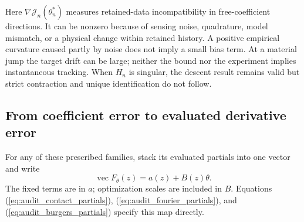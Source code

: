 Here $\nabla\mathcal J_n(\theta_n^*)$ measures retained-data
incompatibility in free-coefficient directions. It can be nonzero because
of sensing noise, quadrature, model mismatch, or a physical change within
retained history. A positive empirical curvature caused partly by noise
does not imply a small bias term. At a material jump the target drift can
be large; neither the bound nor the experiment implies instantaneous
tracking. When $H_n$ is singular, the descent result remains valid but
strict contraction and unique identification do not follow.

\subsection{From coefficient error to evaluated derivative error}
For any of these prescribed families, stack its evaluated partials into
one vector and write
\begin{equation}
 \operatorname{vec}F_\theta(z)=a(z)+B(z)\theta.
 \label{eq:audit_partial_map}
\end{equation}
The fixed terms are in $a$; optimization scales are included in $B$.
Equations (\ref{eq:audit_contact_partials}),
(\ref{eq:audit_fourier_partials}), and
(\ref{eq:audit_burgers_partials}) specify this map directly.

